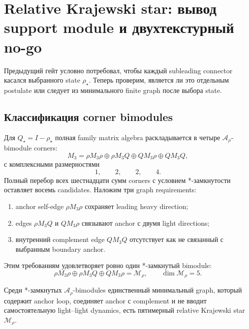 \chapter{Relative Krajewski star: вывод support module и двухтекстурный no-go}

Предыдущий гейт условно потребовал, чтобы каждый subleading connector касался
выбранного state \(\rho_\star\). Теперь проверим, является ли это отдельным
postulate или следует из минимального finite graph после выбора state.

\section{Классификация corner bimodules}

Для \(Q_\star=I-\rho_\star\) полная family matrix algebra раскладывается в
четыре \(\mathcal A_\rho\)-bimodule corners:
\begin{equation}
 M_3=
 \rho M_3\rho
 \oplus\rho M_3Q
 \oplus QM_3\rho
 \oplus QM_3Q,
\end{equation}
с комплексными размерностями
\begin{equation}
 1,\qquad2,\qquad2,\qquad4.
\end{equation}
Полный перебор всех шестнадцати сумм corners с условием *-замкнутости оставляет
восемь candidates. Наложим три graph requirements:
\begin{enumerate}
\item anchor self-edge \(\rho M_3\rho\) сохраняет leading heavy direction;
\item edges \(\rho M_3Q\) и \(QM_3\rho\) связывают anchor с двумя light
directions;
\item внутренний complement edge \(QM_3Q\) отсутствует как не связанный с
выбранным boundary anchor.
\end{enumerate}
Этим требованиям удовлетворяет ровно один *-замкнутый bimodule:
\begin{equation}
 \rho M_3\rho\oplus\rho M_3Q\oplus QM_3\rho
 =\mathcal M_\rho,
 \qquad \dim\mathcal M_\rho=5.
\end{equation}

\begin{theorem}
Среди *-замкнутых \(\mathcal A_\rho\)-bimodules единственный минимальный graph,
который содержит anchor loop, соединяет anchor с complement и не вводит
самостоятельную light--light dynamics, есть пятимерный relative Krajewski
star \(\mathcal M_\rho\).
\end{theorem}

